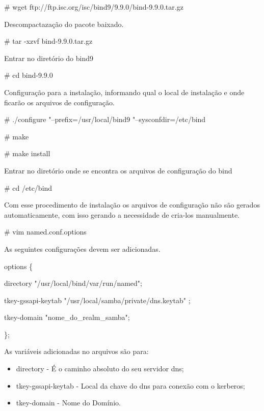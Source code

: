 \# wget ftp://ftp.isc.org/isc/bind9/9.9.0/bind-9.9.0.tar.gz

Descompactazação do pacote baixado.
 
\# tar -xzvf bind-9.9.0.tar.gz

Entrar no diretório do bind9

\# cd bind-9.9.0

Configuração para a instalação, informando qual o local de instalação e onde ficarão os arquivos de configuração.

\# ./configure "--prefix=/usr/local/bind9 "--sysconfdir=/etc/bind

\# make

\# make install
% 

Entrar no diretório onde se encontra os arquivos de configuração do bind

\# cd /etc/bind

Com esse procedimento de instalação os arquivos de configuração não são gerados automaticamente, com isso gerando a necessidade de cria-los manualmente.

\# vim named.conf.options

As seguintes configurações devem ser adicionadas.

options \{
	
directory "/usr/local/bind/var/run/named";

tkey-gssapi-keytab "/usr/local/samba/private/dns.keytab" ;

tkey-domain "nome\_do\_realm\_samba";
	
\};

As variáveis adicionadas no arquivos são para:

\begin{itemize}
	\item{directory} -  É o caminho absoluto do seu servidor dns;
	\item{tkey-gssapi-keytab} - Local da chave do dns para conexão com o kerberos;
	\item{tkey-domain} - Nome do Domínio.
\end{itemize}

